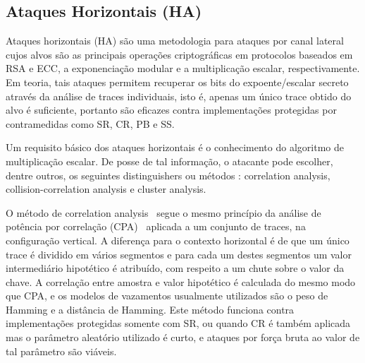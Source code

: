 

\subsection{Ataques Horizontais (HA)}

Ataques horizontais (HA) são uma metodologia para ataques por canal lateral cujos alvos são as principais operações criptográficas em protocolos baseados em RSA e ECC, a exponenciação modular e a multiplicação escalar, respectivamente. Em teoria, tais ataques permitem recuperar os bits do expoente/escalar secreto através da análise de traces individuais, isto é, apenas um único trace obtido do alvo é suficiente, portanto são eficazes contra implementações protegidas por contramedidas como SR, CR, PB e SS.

Um requisito básico dos ataques horizontais é o conhecimento do algoritmo de multiplicação escalar. De posse de tal informação, o atacante pode escolher, dentre outros, os seguintes distinguishers ou métodos : correlation analysis, collision-correlation analysis e cluster analysis.     %

O método de correlation analysis~\cite{Clavier2010} segue o mesmo princípio da análise de potência por correlação (CPA)~ aplicada a um conjunto de traces, na configuração vertical. A diferença para o contexto horizontal é de que um único trace é dividido em vários segmentos e para cada um destes segmentos um valor intermediário hipotético é atribuído, com respeito a um chute sobre o valor da chave. A correlação entre amostra e valor hipotético é calculada do mesmo modo que CPA, e os modelos de vazamentos usualmente utilizados são o peso de Hamming e a distância de Hamming. Este método funciona contra implementações protegidas somente com SR, ou quando CR é também aplicada mas o parâmetro aleatório utilizado é curto, e ataques por força bruta ao valor de tal parâmetro são viáveis.

